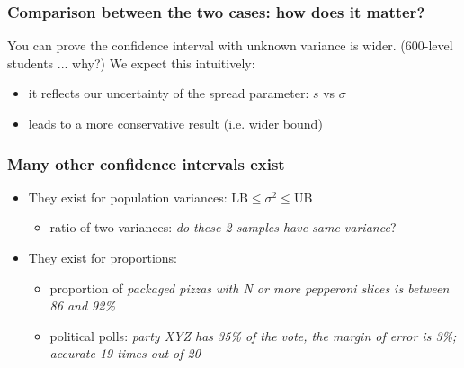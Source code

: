 \begin{frame}\frametitle{Comparison between the two cases: how does it matter?}

	You can prove the confidence interval with unknown variance is wider. (600-level students ... why?)
	\vspace{12pt}
	We expect this intuitively:
	\begin{itemize}
		\item	it reflects our uncertainty of the spread parameter: $s$ vs $\sigma$
		\item	leads to a more conservative result (i.e. wider bound)
	\end{itemize}
\end{frame}

\begin{frame}\frametitle{Many other confidence intervals exist}
	\begin{itemize}
		\item	They exist for population variances: $\text{LB} \leq \sigma^2 \leq \text{UB}$
		\begin{itemize}
			\item	ratio of two variances: \emph{do these 2 samples have same variance}?
		\end{itemize}

		\vspace{12pt}
		\item	They exist for proportions:
		\begin{itemize}
			\item	proportion of \emph{packaged pizzas with N or more pepperoni slices is between 86 and 92\%}
			\item	political polls: \emph{party XYZ has 35\% of the vote, the margin of error is 3\%; accurate 19 times out of 20}
		\end{itemize}
	\end{itemize}
\end{frame}

